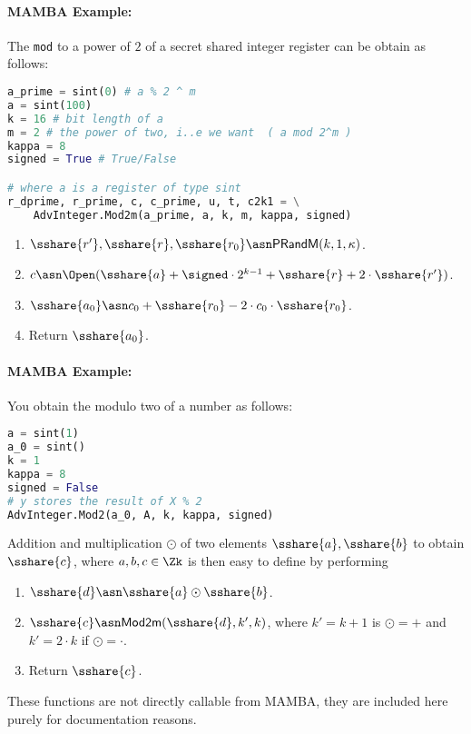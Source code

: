 \paragraph{MAMBA Example:} The \verb|mod| to a power of $2$ of a secret shared integer register can be obtain as follows: 
\begin{lstlisting}[language={python}]
a_prime = sint(0) # a % 2 ^ m
a = sint(100)
k = 16 # bit length of a
m = 2 # the power of two, i..e we want  ( a mod 2^m )
kappa = 8 
signed = True # True/False

# where a is a register of type sint
r_dprime, r_prime, c, c_prime, u, t, c2k1 = \
    AdvInteger.Mod2m(a_prime, a, k, m, kappa, signed)
\end{lstlisting}


\begin{enumerate}
\item $\sshare{r'}, \sshare{r}, \sshare{r_0} \asn \mathsf{PRandM}(k,1,\kappa)$.
\item $c \asn \Open(\sshare{a}+\signed \cdot 2^{k-1}+\sshare{r}+2 \cdot \sshare{r'})$.
\item $\sshare{a_0} \asn c_0+\sshare{r_0}-2 \cdot c_0 \cdot \sshare{r_0}$.
\item Return $\sshare{a_0}$.
\end{enumerate}

\paragraph{MAMBA Example:} You obtain the modulo two of a number as follows:
\begin{lstlisting}[language={python}]
a = sint(1)
a_0 = sint()
k = 1
kappa = 8
signed = False
# y stores the result of X % 2
AdvInteger.Mod2(a_0, A, k, kappa, signed)
\end{lstlisting}

Addition and multiplication $\odot$ of two elements $\sshare{a}, \sshare{b}$
to obtain $\sshare{c}$, where $a,b,c \in \Zk$ is then easy to define
by performing
\begin{enumerate}
\item $\sshare{d} \asn \sshare{a} \odot \sshare{b}$.
\item $\sshare{c} \asn \mathsf{Mod2m}(\sshare{d},k',k)$,
        where $k'=k+1$ is $\odot=+$ and $k'=2\cdot k$ if $\odot=\cdot$.
\item Return $\sshare{c}$.
\end{enumerate}
These functions are not directly callable from MAMBA, they are
included here purely for documentation reasons.

